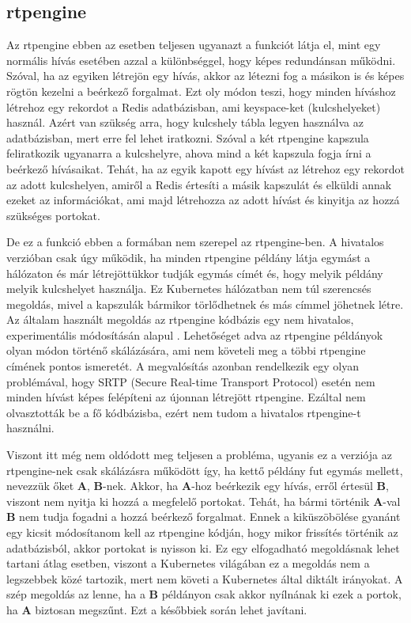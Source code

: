 \subsection{rtpengine}\label{sec:rtpengine}

Az rtpengine ebben az esetben teljesen ugyanazt a funkciót látja el, mint egy normális 
hívás esetében azzal a különbséggel, hogy képes redundánsan működni. Szóval, ha az 
egyiken létrejön egy hívás, akkor az létezni fog a másikon is és képes rögtön kezelni a 
beérkező forgalmat. Ezt oly módon teszi, hogy minden híváshoz létrehoz egy rekordot a 
Redis adatbázisban, ami keyspace-ket (kulcshelyeket) használ. Azért van szükség arra, 
hogy kulcshely tábla legyen használva az adatbázisban, mert erre fel lehet iratkozni. 
Szóval a két rtpengine kapszula feliratkozik ugyanarra a kulcshelyre, ahova mind a két 
kapszula fogja írni a beérkező hívásaikat. Tehát, ha az egyik kapott egy hívást az 
létrehoz egy rekordot az adott kulcshelyen, amiről a Redis értesíti a másik kapszulát és 
elküldi annak ezeket az információkat, ami majd létrehozza az adott hívást és kinyitja az 
hozzá szükséges portokat.  

De ez a funkció ebben a formában nem szerepel az rtpengine-ben. A hivatalos verzióban 
csak úgy működik, ha minden rtpengine példány látja egymást a hálózaton és már 
létrejöttükkor tudják egymás címét és, hogy melyik példány melyik kulcshelyet használja. 
Ez Kubernetes hálózatban nem túl szerencsés megoldás, mivel a kapszulák bármikor 
törlődhetnek és más címmel jöhetnek létre. Az általam használt megoldás az
rtpengine kódbázis egy nem hivatalos, experimentális módosításán alapul \cite{oded}. 
Lehetőséget adva az rtpengine példányok olyan módon történő skálázására, ami nem követeli 
meg a többi rtpengine címének pontos ismeretét. A megvalósítás azonban rendelkezik egy 
olyan problémával, hogy SRTP (Secure Real-time Transport Protocol) esetén nem minden 
hívást képes felépíteni az újonnan létrejött rtpengine. Ezáltal nem olvasztották be a fő 
kódbázisba, ezért nem tudom a hivatalos rtpengine-t használni.

Viszont itt még nem oldódott meg teljesen a probléma, ugyanis ez a verziója az 
rtpengine-nek csak skálázásra működött így, ha kettő példány fut egymás mellett, nevezzük 
őket \textbf{A}, \textbf{B}-nek. Akkor, ha \textbf{A}-hoz beérkezik egy hívás, erről 
értesül \textbf{B}, viszont nem nyitja ki hozzá a megfelelő portokat. Tehát, ha bármi 
történik \textbf{A}-val \textbf{B} nem tudja fogadni a hozzá beérkező forgalmat. Ennek a 
kiküszöbölése gyanánt egy kicsit módosítanom kell az rtpengine kódján, hogy mikor 
frissítés történik az adatbázisból, akkor portokat is nyisson ki. Ez egy elfogadható 
megoldásnak lehet tartani átlag esetben, viszont a Kubernetes világában ez a megoldás nem 
a legszebbek közé tartozik, mert nem követi a Kubernetes által diktált irányokat. A szép 
megoldás az lenne, ha a \textbf{B} példányon csak akkor nyílnának ki ezek a portok, ha 
\textbf{A} biztosan megszűnt. Ezt a későbbiek során lehet javítani.

